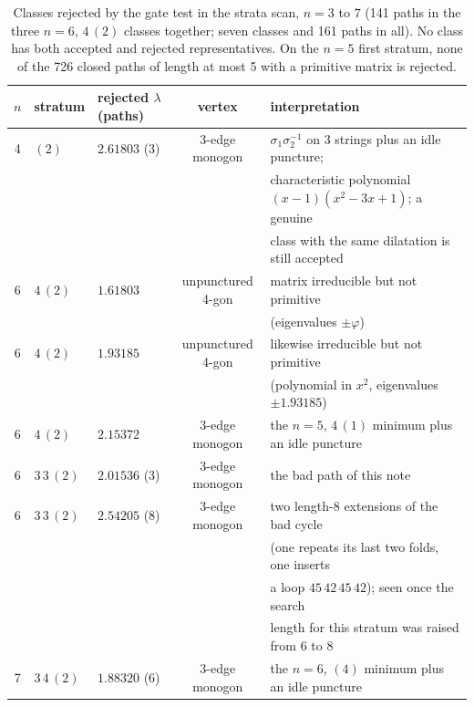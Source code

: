 \documentclass[12pt]{amsart}
\newcommand{\lam}{\lambda}
\theoremstyle{plain}
\theoremstyle{definition}
\begin{document}
\begin{table}[h]
  \centering
  \small
  \begin{tabular}{@{}cllcl@{}}
    \toprule
    $n$ & stratum & rejected $\lam$ (paths) & vertex & interpretation \\
    \midrule
    4 & $(2)$ & $2.61803$ (3) & 3-edge monogon & $\sigma_1\sigma_2^{-1}$ on 3 strings plus an idle puncture; \\
      &       &               &                & characteristic polynomial $(x-1)(x^2-3x+1)$; a genuine \\
      &       &               &                & class with the same dilatation is still accepted \\
    6 & $4\,(2)$ & $1.61803$ & unpunctured 4-gon & matrix irreducible but not primitive \\
      &          &           &                   & (eigenvalues $\pm\varphi$) \\
    6 & $4\,(2)$ & $1.93185$ & unpunctured 4-gon & likewise irreducible but not primitive \\
      &          &           &                   & (polynomial in $x^2$, eigenvalues $\pm1.93185$) \\
    6 & $4\,(2)$ & $2.15372$ & 3-edge monogon & the $n=5$, $4\,(1)$ minimum plus an idle puncture \\
    6 & $3\,3\,(2)$ & $2.01536$ (3) & 3-edge monogon & the bad path of this note \\
    6 & $3\,3\,(2)$ & $2.54205$ (8) & 3-edge monogon & two length-8 extensions of the bad cycle \\
      &             &               &                & (one repeats its last two folds, one inserts \\
      &             &               &                & a loop $45\,42\,45\,42$); seen once the search \\
      &             &               &                & length for this stratum was raised from 6 to 8 \\
    7 & $3\,4\,(2)$ & $1.88320$ (6) & 3-edge monogon & the $n=6$, $(4)$ minimum plus an idle puncture \\
    \bottomrule
  \end{tabular}
  \caption{Classes rejected by the gate test in the strata scan, $n=3$ to
    $7$ (141 paths in the three $n=6$, $4\,(2)$ classes together; seven
    classes and 161 paths in all).  No class
    has both accepted and rejected representatives.  On the $n=5$ first
    stratum, none of the 726 closed paths of length at most 5 with a
    primitive matrix is rejected.}
  \label{tab:census}
\end{table}
\end{document}
